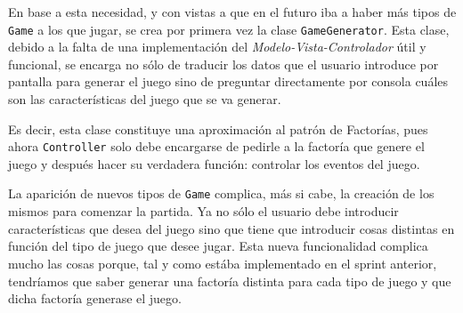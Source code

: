 \documentclass[../DocumentoOficial.tex]{subfiles}
\begin{document}
\begin{sprint}[3]
En base a esta necesidad, y con vistas a que en el futuro iba a haber más tipos de \texttt{Game} a los que jugar, se crea por primera vez la clase \texttt{GameGenerator}. Esta clase, debido a la falta de una implementación del \textit{Modelo-Vista-Controlador} útil y funcional, se encarga no sólo de traducir los datos que el usuario introduce por pantalla para generar el juego sino de preguntar directamente por consola cuáles son las características del juego que se va generar.

Es decir, esta clase constituye una aproximación al patrón de Factorías, pues ahora \texttt{Controller} solo debe encargarse de pedirle a la factoría que genere el juego y después hacer su verdadera función: controlar los eventos del juego.
\end{sprint}

\begin{sprint}[4]
La aparición de nuevos tipos de \texttt{Game} complica, más si cabe, la creación de los mismos para comenzar la partida. Ya no sólo el usuario debe introducir características que desea del juego sino que tiene que introducir cosas distintas en función del tipo de juego que desee jugar. Esta nueva funcionalidad complica mucho las cosas porque, tal y como estába implementado en el sprint anterior, tendríamos que saber generar una factoría distinta para cada tipo de juego y que dicha factoría generase el juego.


\end{sprint}
\end{document}
